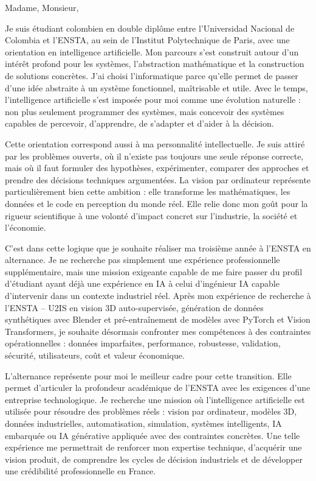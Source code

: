 \documentclass[10pt,a4paper]{article}
\begin{document}
{\small

Madame, Monsieur,

Je suis étudiant colombien en double diplôme entre l’Universidad Nacional de Colombia et l'ENSTA, au sein de l’Institut Polytechnique de Paris, avec une orientation en intelligence artificielle. Mon parcours s’est construit autour d’un intérêt profond pour les systèmes, l’abstraction mathématique et la construction de solutions concrètes. J’ai choisi l’informatique parce qu’elle permet de passer d’une idée abstraite à un système fonctionnel, maîtrisable et utile. Avec le temps, l’intelligence artificielle s’est imposée pour moi comme une évolution naturelle : non plus seulement programmer des systèmes, mais concevoir des systèmes capables de percevoir, d’apprendre, de s’adapter et d’aider à la décision.

Cette orientation correspond aussi à ma personnalité intellectuelle. Je suis attiré par les problèmes ouverts, où il n’existe pas toujours une seule réponse correcte, mais où il faut formuler des hypothèses, expérimenter, comparer des approches et prendre des décisions techniques argumentées. La vision par ordinateur représente particulièrement bien cette ambition : elle transforme les mathématiques, les données et le code en perception du monde réel. Elle relie donc mon goût pour la rigueur scientifique à une volonté d’impact concret sur l’industrie, la société et l’économie.

C’est dans cette logique que je souhaite réaliser ma troisième année à l'ENSTA en alternance. Je ne recherche pas simplement une expérience professionnelle supplémentaire, mais une mission exigeante capable de me faire passer du profil d’étudiant ayant déjà une expérience en IA à celui d’ingénieur IA capable d’intervenir dans un contexte industriel réel. Après mon expérience de recherche à l'ENSTA – U2IS en vision 3D auto-supervisée, génération de données synthétiques avec Blender et pré-entraînement de modèles avec PyTorch et Vision Transformers, je souhaite désormais confronter mes compétences à des contraintes opérationnelles : données imparfaites, performance, robustesse, validation, sécurité, utilisateurs, coût et valeur économique.

L’alternance représente pour moi le meilleur cadre pour cette transition. Elle permet d’articuler la profondeur académique de l'ENSTA avec les exigences d’une entreprise technologique. Je recherche une mission où l’intelligence artificielle est utilisée pour résoudre des problèmes réels : vision par ordinateur, modèles 3D, données industrielles, automatisation, simulation, systèmes intelligents, IA embarquée ou IA générative appliquée avec des contraintes concrètes. Une telle expérience me permettrait de renforcer mon expertise technique, d’acquérir une vision produit, de comprendre les cycles de décision industriels et de développer une crédibilité professionnelle en France.

}
\end{document}
